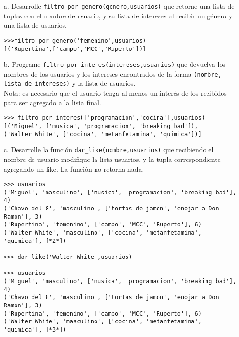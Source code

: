 \begin{itemize}
    \item[a.] Desarrolle \texttt{filtro\_por\_genero(genero,usuarios)} que retorne una lista de tuplas con el nombre de usuario, y su lista de intereses al recibir un género y una lista de usuarios.
\begin{lstlisting}[style=consola]
>>>filtro_por_genero('femenino',usuarios)
[('Rupertina',['campo','MCC','Ruperto'])]
\end{lstlisting}
    \item[b.] Programe \texttt{filtro\_por\_interes(intereses,usuarios)} que devuelva los nombres de los usuarios y los intereses encontrados de la forma \texttt{(nombre, lista de intereses)} y la lista de usuarios.\\
    Nota: es necesario que el usuario tenga al menos un interés de los recibidos para ser agregado a la lista final.
\begin{lstlisting}[style=consola]
>>> filtro_por_interes(['programacion','cocina'],usuarios)
[('Miguel', ['musica', 'programacion', 'breaking bad']), 
('Walter White', ['cocina', 'metanfetamina', 'quimica'])]
\end{lstlisting}
    \item[c.] Desarrolle la función \texttt{dar\_like(nombre,usuarios)} que recibiendo el nombre de usuario modifique la lista usuarios, y la tupla correspondiente agregando un like. La función no retorna nada.
\begin{lstlisting}[style=consola]
>>> usuarios
('Miguel', 'masculino', ['musica', 'programacion', 'breaking bad'], 4)
('Chavo del 8', 'masculino', ['tortas de jamon', 'enojar a Don Ramon'], 3)
('Rupertina', 'femenino', ['campo', 'MCC', 'Ruperto'], 6)
('Walter White', 'masculino', ['cocina', 'metanfetamina', 'quimica'], [*2*])

>>> dar_like('Walter White',usuarios)

>>> usuarios
('Miguel', 'masculino', ['musica', 'programacion', 'breaking bad'], 4)
('Chavo del 8', 'masculino', ['tortas de jamon', 'enojar a Don Ramon'], 3)
('Rupertina', 'femenino', ['campo', 'MCC', 'Ruperto'], 6)
('Walter White', 'masculino', ['cocina', 'metanfetamina', 'quimica'], [*3*])
\end{lstlisting}
\end{itemize}